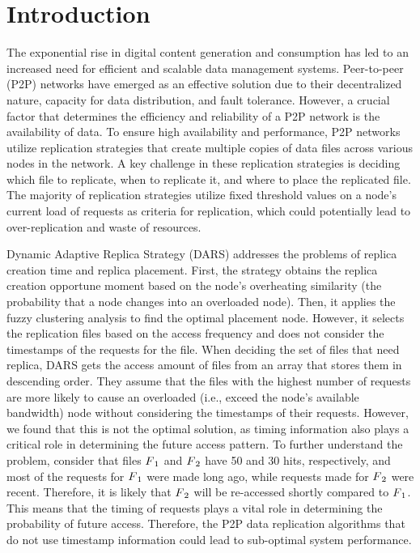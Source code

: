 \documentclass[10pt, conference]{IEEEtran}
\begin{document}
\section{Introduction}\label{sec:introduction}


The exponential rise in digital content generation and consumption has led to an increased need for efficient and scalable data management systems. Peer-to-peer (P2P) \cite{sun_2018_dars} networks have emerged as an effective solution due to their decentralized nature, capacity for data distribution, and fault tolerance. However, a crucial factor that determines the efficiency and reliability of a P2P network is the availability of data. To ensure high availability and performance, P2P networks utilize replication strategies that create multiple copies of data files across various nodes in the network. A key challenge in these replication strategies is deciding which file to replicate, when to replicate it, and where to place the replicated file. The majority of replication strategies utilize fixed threshold values on a node's current load of requests as criteria for replication, which could potentially lead to over-replication and waste of resources.

Dynamic Adaptive Replica Strategy (DARS) \cite{sun_2018_dars} addresses the problems of replica creation time and replica placement. First, the strategy obtains the replica creation opportune moment based on the node's overheating similarity (the probability that a node changes into an overloaded node). Then, it applies the fuzzy clustering analysis \cite{ling_2007_fuzzy} to find the optimal placement node. However, it selects the replication files based on the access frequency and does not consider the timestamps of the requests for the file. When deciding the set of files that need replica, DARS gets the access amount of files from an array that stores them in descending order. They assume that the files with the highest number of requests are more likely to cause an overloaded (i.e., exceed the node's available bandwidth) node without considering the timestamps of their requests. However, we found that this is not the optimal solution, as timing information also plays a critical role in determining the future access pattern. To further understand the problem, consider that files $F\textsubscript{1}$ and $F\textsubscript{2}$ have 50 and 30 hits, respectively, and most of the requests for $F\textsubscript{1}$ were made long ago, while requests made for $F\textsubscript{2}$ were recent. Therefore, it is likely that $F\textsubscript{2}$ will be re-accessed shortly compared to $F\textsubscript{1}$. This means that the timing of requests plays a vital role in determining the probability of future access. Therefore, the P2P data replication algorithms that do not use timestamp information could lead to sub-optimal system performance. 
\end{document}
